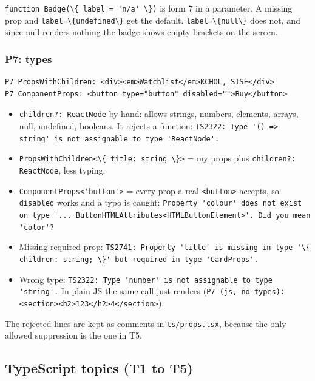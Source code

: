 \documentclass[
  11pt,
]{article}
\newcommand{\passthrough}[1]{#1}
\providecommand{\tightlist}{%
  \setlength{\itemsep}{0pt}\setlength{\parskip}{0pt}}
\begin{document}
\passthrough{\lstinline!function Badge(\{ label = 'n/a' \})!} is form 7
in a parameter. A missing prop and
\passthrough{\lstinline!label=\{undefined\}!} get the default.
\passthrough{\lstinline!label=\{null\}!} does not, and since null
renders nothing the badge shows empty brackets on the screen.

\subsubsection{P7: types}\label{p7-types}

\begin{lstlisting}
P7 PropsWithChildren: <div><em>Watchlist</em>KCHOL, SISE</div>
P7 ComponentProps: <button type="button" disabled="">Buy</button>
\end{lstlisting}

\begin{itemize}
\tightlist
\item
  \passthrough{\lstinline!children?: ReactNode!} by hand: allows
  strings, numbers, elements, arrays, null, undefined, booleans. It
  rejects a function:
  \passthrough{\lstinline!TS2322: Type '() => string' is not assignable to type 'ReactNode'.!}
\item
  \passthrough{\lstinline!PropsWithChildren<\{ title: string \}>!} = my
  props plus \passthrough{\lstinline!children?: ReactNode!}, less
  typing.
\item
  \passthrough{\lstinline!ComponentProps<'button'>!} = every prop a real
  \passthrough{\lstinline!<button>!} accepts, so
  \passthrough{\lstinline!disabled!} works and a typo is caught:
  \passthrough{\lstinline!Property 'colour' does not exist on type '... ButtonHTMLAttributes<HTMLButtonElement>'. Did you mean 'color'?!}
\item
  Missing required prop:
  \passthrough{\lstinline!TS2741: Property 'title' is missing in type '\{ children: string; \}' but required in type 'CardProps'.!}
\item
  Wrong type:
  \passthrough{\lstinline!TS2322: Type 'number' is not assignable to type 'string'.!}
  In plain JS the same call just renders
  (\passthrough{\lstinline!P7 (js, no types): <section><h2>123</h2>4</section>!}).
\end{itemize}

The rejected lines are kept as comments in
\passthrough{\lstinline!ts/props.tsx!}, because the only allowed
suppression is the one in T5.

\subsection{TypeScript topics (T1 to
T5)}\label{typescript-topics-t1-to-t5}
\end{document}
